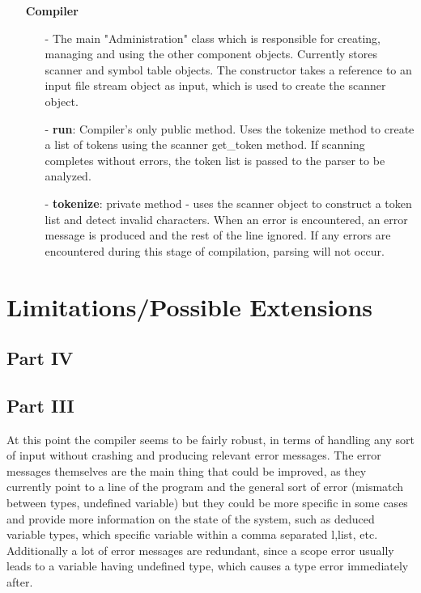 \documentclass{article}
\begin{document}
\begin{itemize}
        \item[]\textbf{Compiler}
            \begin{itemize}
                \item[-] The main "Administration" class which is responsible for creating, managing and using the other component objects. Currently stores scanner and symbol table objects. The constructor takes a reference to an input file stream object as input, which is used to create the scanner object. 
                \item[-] \textbf{run}: Compiler's only public method. Uses the tokenize method to create a list of tokens using the scanner get\_token method. If scanning completes without errors, the token list is passed to the parser to be analyzed.
                \item[-] \textbf{tokenize}: private method - uses the scanner object to construct a token list and detect invalid characters. When an error is encountered, an error message is produced and the rest of the line ignored. If any errors are encountered during this stage of compilation, parsing will not occur.
            \end{itemize}

    \end{itemize}

    \section{Limitations/Possible Extensions}

        \subsection{Part IV}

        \subsection{Part III}

        At this point the compiler seems to be fairly robust, in terms of handling any sort of input without crashing and producing relevant error messages. The error messages themselves are the main thing that could be improved, as they currently point to a line of the program and the general sort of error (mismatch between types, undefined variable) but they could be more specific in some cases and provide more information on the state of the system, such as deduced variable types, which specific variable within a comma separated l,list, etc. Additionally a lot of error messages are redundant, since a scope error usually leads to a variable having undefined type, which causes a type error immediately after. 
\end{document}
